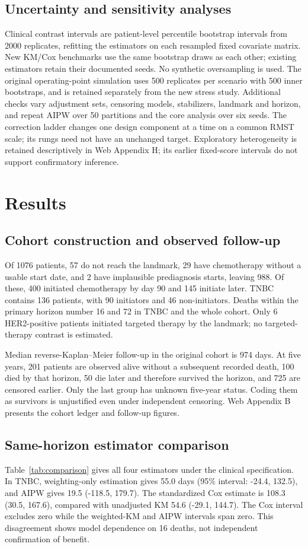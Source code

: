 \documentclass[12pt,letterpaper]{article}
\begin{document}
\subsection{Uncertainty and sensitivity analyses}
Clinical contrast intervals are patient-level percentile bootstrap intervals from 2000 replicates,
refitting the estimators on each resampled fixed covariate matrix. New KM/Cox benchmarks use the same
bootstrap draws as each other; existing estimators retain their documented seeds.
No synthetic oversampling is used. The original operating-point simulation uses 500 replicates per scenario
with 500 inner bootstraps, and is retained separately from the new stress study.
Additional checks vary adjustment sets, censoring models, stabilizers, landmark and horizon, and repeat
AIPW over 50 partitions and the core analysis over six seeds.
The correction ladder changes one design component at a time on a common RMST scale; its rungs need
not have an unchanged target. Exploratory heterogeneity is retained descriptively in Web Appendix H;
its earlier fixed-score intervals do not support confirmatory inference.

\section{Results}
\subsection{Cohort construction and observed follow-up}
Of 1076 patients, 57 do not reach the landmark,
29 have chemotherapy without a usable start date, and 2
have implausible prediagnosis starts, leaving 988.
Of these, 400 initiated chemotherapy by day 90 and 145 initiate later.
TNBC contains 136 patients, with 90 initiators and 46 non-initiators.
Deaths within the primary horizon number 16 and 72 in TNBC and the whole cohort.
Only 6 HER2-positive patients initiated targeted therapy by the landmark; no targeted-therapy contrast is estimated.

Median reverse-Kaplan--Meier follow-up in the original cohort is 974 days.
At five years, 201 patients are observed alive without a subsequent recorded death,
100 died by that horizon, 50 die later and therefore survived the horizon,
and 725 are censored earlier. Only the last group has unknown five-year status.
Coding them as survivors is unjustified even under independent censoring.
Web Appendix B presents the cohort ledger and follow-up figures.

\subsection{Same-horizon estimator comparison}
Table~\ref{tab:comparison} gives all four estimators under the clinical specification.
In TNBC, weighting-only estimation gives 55.0 days (95\% interval: -24.4, 132.5),
and AIPW gives 19.5 (-118.5, 179.7). The standardized Cox estimate is
108.3 (30.5, 167.6), compared with unadjusted KM 54.6 (-29.1, 144.7).
The Cox interval excludes zero while the weighted-KM and AIPW intervals span zero.
This disagreement shows model dependence on 16 deaths, not independent confirmation of benefit.
\end{document}
